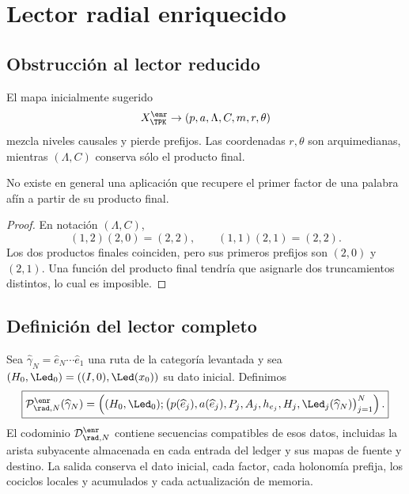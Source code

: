 \chapter{Lector radial enriquecido}

\section{Obstrucción al lector reducido}

El mapa inicialmente sugerido
\[
 X_{\TPK}^{\enr}\to(p,a,\Lambda,C,m,r,\theta)
\]
mezcla niveles causales y pierde prefijos. Las coordenadas \(r,\theta\) son
arquimedianas, mientras \((\Lambda,C)\) conserva sólo el producto final.

\begin{proposition}
No existe en general una aplicación que recupere el primer factor de una
palabra afín a partir de su producto final.
\end{proposition}
\begin{proof}
En notación \((\Lambda,C)\),
\[
 (1,2)(2,0)=(2,2),
 \qquad
 (1,1)(2,1)=(2,2).
\]
Los dos productos finales coinciden, pero sus primeros prefijos son
\((2,0)\) y \((2,1)\). Una función del producto final tendría que asignarle
dos truncamientos distintos, lo cual es imposible.
\end{proof}

\section{Definición del lector completo}

Sea
\(\widehat\gamma_N=\widehat e_N\cdots\widehat e_1\) una ruta de la
categoría levantada y sea \((H_0,\Led_0)=((I,0),\Led(x_0))\) su dato
inicial. Definimos
\begin{equation}
 \boxed{
 \mathcal P_{\rad,N}^{\enr}(\widehat\gamma_N)
 =\left(
 (H_0,\Led_0);
 \bigl(p(\widehat e_j),a(\widehat e_j),P_j,A_j,
 h_{e_j},H_j,\Led_j(\widehat\gamma_N)\bigr)_{j=1}^{N}
 \right).}
 \label{espiral:eq:lector-radial-enriquecido}
\end{equation}
El codominio \(\mathcal D_{\rad,N}^{\enr}\) contiene secuencias compatibles
de esos datos, incluidas la arista subyacente almacenada en cada entrada del
ledger y sus mapas de fuente y destino. La salida conserva el dato inicial,
cada factor, cada holonomía prefija, los cociclos locales y acumulados y cada
actualización de memoria.

